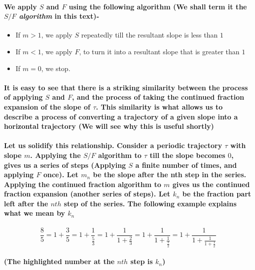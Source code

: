 \documentclass{report}
\begin{document}
\paragraph{We apply $S$ and $F$ using the following algorithm (We shall term it the \textit{$S/F$ algorithm} in this text)-}

\begin{itemize}
\item  {If $m>1$, we apply $S$ repeatedly till the resultant slope is less than $1$}

\item  {If $m<1$, we apply $F$, to turn it into a resultant slope that is greater than $1$}

\item  {If $m=0$, we stop.}
\end{itemize}

\paragraph{It is easy to see that there is a striking similarity between the process of applying $S$ and $F$, and the process of taking the continued fraction expansion of the slope of $\tau$. This similarity is what allows us to describe a process of converting a trajectory of a given slope into a horizontal trajectory (We will see why this is useful shortly)}

\paragraph{Let us solidify this relationship. Consider a periodic trajectory $\tau$  with slope $m$. Applying the $S/F$ algorithm to $\tau$ till the slope becomes $0$, gives us a series of steps (Applying $S$ a finite number of times, and applying $F$ once). Let $m_n$ be the slope after the nth step in the series. Applying the continued fraction algorithm to $m$ gives us the continued fraction expansion (another series of steps). Let $k_n$ be the fraction part left after the $nth$ step of the series. The following example explains what we mean by $k_n$ }

\begin{equation}
\frac{8}{5}=1+\frac{3}{5}=1+\frac{1}{\frac{5}{3}}=1+\frac{1}{1+\frac{2}{3}}=1+\frac{1}{1+\frac{1}{\frac{3}{2}}}=1+\frac{1}{1+\frac{1}{1+\frac{1}{2}}}
\end{equation}

\paragraph{(The highlighted number at the $nth$ step is $k_n$)}
\end{document}
